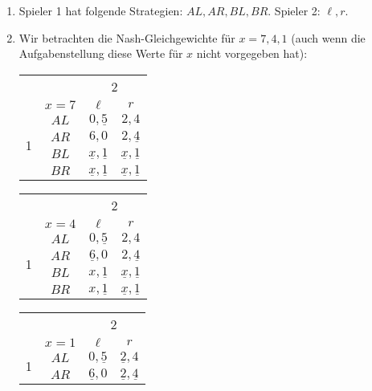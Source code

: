 \begin{enumerate}
  \item Spieler 1 hat folgende Strategien: $AL, AR, BL, BR$.
    Spieler 2: $\ell, r$.

  \item Wir betrachten die Nash-Gleichgewichte für $x=7,4,1$ (auch wenn die
    Aufgabenstellung diese Werte für $x$ nicht vorgegeben hat):
    \begin{center}
      \begin{minipage}{0.30\textwidth}
        \begin{tabular}{cccc}
          & & \multicolumn{2}{c}{2}\\
          & $x=7$ & $\ell$ & $r$\\
          \multirow{4}{*}{1}
          & $AL$ & $0,\underline{5}$ & $2,4$\\
          & $AR$ & $6,0$ & $2,\underline{4}$\\
          & $BL$ & $\underline{x},\underline{1}$ & $\underline{x},\underline{1}$\\
          & $BR$ & $\underline{x},\underline{1}$ & $\underline{x},\underline{1}$
        \end{tabular}
      \end{minipage}
      \begin{minipage}{0.30\textwidth}
        \begin{tabular}{cccc}
          & & \multicolumn{2}{c}{2}\\
          & $x=4$ & $\ell$ & $r$\\
          \multirow{4}{*}{1}
          & $AL$ & $0,\underline{5}$ & $2,4$\\
          & $AR$ & $\underline{6},0$ & $2,\underline{4}$\\
          & $BL$ & $x,\underline{1}$ & $\underline{x},\underline{1}$\\
          & $BR$ & $x,\underline{1}$ & $\underline{x},\underline{1}$
        \end{tabular}
      \end{minipage}
      \begin{minipage}{0.30\textwidth}
        \begin{tabular}{cccc}
          & & \multicolumn{2}{c}{2}\\
          & $x=1$ & $\ell$ & $r$\\
          \multirow{4}{*}{1}
          & $AL$ & $0,\underline{5}$ & $\underline{2},4$\\
          & $AR$ & $\underline{6},0$ & $\underline{2},\underline{4}$\\

\end{tabular}
\end{minipage}
\end{center}
\end{enumerate}
